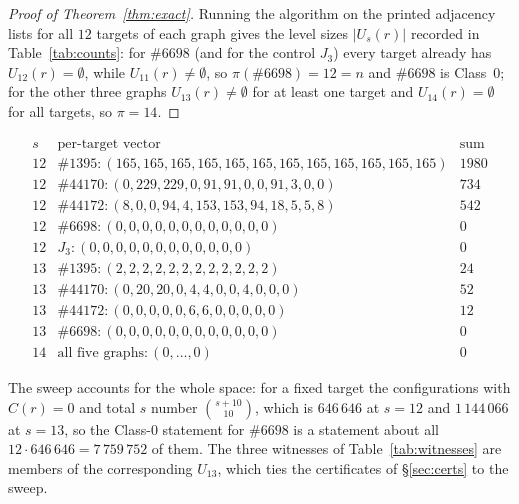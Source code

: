 \documentclass[11pt]{amsart}
\theoremstyle{remark}
\newcommand{\HoG}[1]{\#\mathrm{#1}}
\begin{document}
\begin{proof}[Proof of Theorem~\ref{thm:exact}]
Running the algorithm on the printed adjacency lists for all $12$ targets of each
graph gives the level sizes $\lvert U_s(r)\rvert$ recorded in
Table~\ref{tab:counts}: for $\HoG{6698}$ (and for the control $J_3$) every target
already has $U_{12}(r)=\emptyset$, while $U_{11}(r)\ne\emptyset$, so
$\pi(\HoG{6698})=12=n$ and $\HoG{6698}$ is Class~$0$; for the other three graphs
$U_{13}(r)\ne\emptyset$ for at least one target and $U_{14}(r)=\emptyset$ for all
targets, so $\pi=14$.
\end{proof}

\begin{table}[ht]
\caption{$\lvert U_s(r)\rvert$ by target $r=0,\dots,11$, and the sums over all
$12$ targets. Every entry is a count of $r$-unsolvable configurations; a
configuration with a pebble on $r$ is $r$-solvable by definition and is not
counted.}
\label{tab:counts}
\[
\begin{array}{llr}
s & \text{per-target vector} & \text{sum}\\\hline
12 & \HoG{1395}\colon (165,165,165,165,165,165,165,165,165,165,165,165) & 1980\\
12 & \HoG{44170}\colon (0,229,229,0,91,91,0,0,91,3,0,0) & 734\\
12 & \HoG{44172}\colon (8,0,0,94,4,153,153,94,18,5,5,8) & 542\\
12 & \HoG{6698}\colon (0,0,0,0,0,0,0,0,0,0,0,0) & 0\\
12 & J_3\colon (0,0,0,0,0,0,0,0,0,0,0,0) & 0\\[2pt]
13 & \HoG{1395}\colon (2,2,2,2,2,2,2,2,2,2,2,2) & 24\\
13 & \HoG{44170}\colon (0,20,20,0,4,4,0,0,4,0,0,0) & 52\\
13 & \HoG{44172}\colon (0,0,0,0,0,6,6,0,0,0,0,0) & 12\\
13 & \HoG{6698}\colon (0,0,0,0,0,0,0,0,0,0,0,0) & 0\\[2pt]
14 & \text{all five graphs}\colon (0,\dots,0) & 0
\end{array}
\]
\end{table}

The sweep accounts for the whole space: for a fixed target the configurations with
$C(r)=0$ and total $s$ number $\binom{s+10}{10}$, which is $646\,646$ at $s=12$
and $1\,144\,066$ at $s=13$, so the Class-$0$ statement for $\HoG{6698}$ is a
statement about all $12\cdot646\,646=7\,759\,752$ of them. The three witnesses of
Table~\ref{tab:witnesses} are members of the corresponding $U_{13}$, which ties
the certificates of \S\ref{sec:certs} to the sweep.
\end{document}
